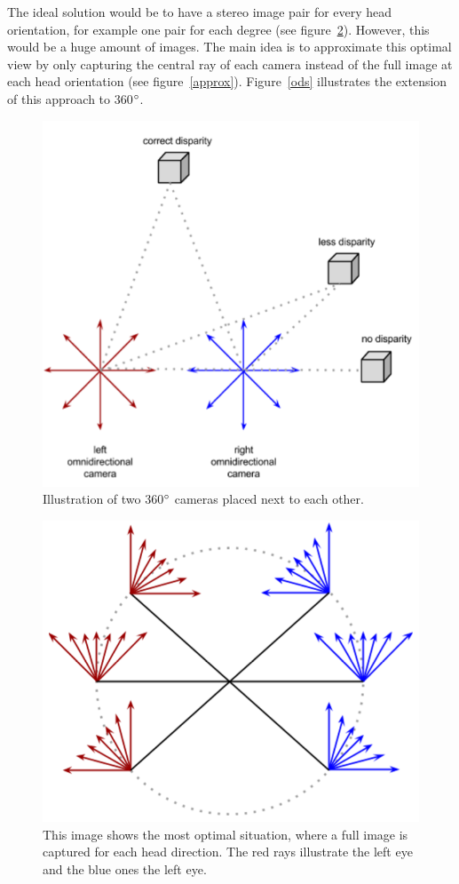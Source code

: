 \documentclass[10pt,twocolumn,letterpaper]{article}
\begin{document}
The ideal solution would be to have a stereo image pair for every head orientation, for example one pair for each degree (see figure~\ref{wanted}). However, this would be a huge amount of images. The main idea is to approximate this optimal view by only capturing the central ray of each camera instead of the full image at each head orientation (see figure~\ref{approx}). Figure~\ref{ods} illustrates the extension of this approach to 360$\degree$.

\begin{figure}[t]
\begin{center}
   \includegraphics[width=0.8\linewidth]{pictures/two_360.png}
\end{center}
   \caption{Illustration of two 360$\degree$ cameras placed next to each other.}
\label{two_360}
\end{figure}

\begin{figure}[t]
\begin{center}
   \includegraphics[width=0.5\linewidth]{pictures/wanted.png}
\end{center}
   \caption{This image shows the most optimal situation, where a full image is captured for each head direction. The red rays illustrate the left eye and the blue ones the left eye.}
\label{wanted}
\end{figure}
\end{document}
